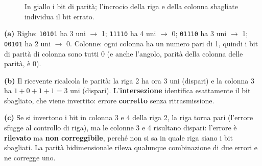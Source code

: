 \svolgimento
\begin{figure}[H]
\centering
\newcommand{\cella}[3]{\node[draw=black!40, minimum size=0.55cm, font=\small\ttfamily, fill=#3] at (#1) {#2};}
\caption{In giallo i bit di parità; l'incrocio della riga e della colonna sbagliate individua il bit errato.}
\end{figure}

\textbf{(a)} Righe: \texttt{10101} ha 3 uni $\rightarrow$ 1; \texttt{11110} ha 4 uni $\rightarrow$ 0; \texttt{01110} ha 3 uni
$\rightarrow$ 1; \texttt{00101} ha 2 uni $\rightarrow$ 0. Colonne: ogni colonna ha un numero pari di 1, quindi i bit di parità di
colonna sono tutti 0 (e anche l'angolo, parità della colonna delle parità, è 0).

\textbf{(b)} Il ricevente ricalcola le parità: la riga 2 ha ora 3 uni (dispari) e la colonna 3 ha $1+0+1+1 = 3$ uni (dispari).
L'\textbf{intersezione} identifica esattamente il bit sbagliato, che viene invertito: errore \textbf{corretto} senza ritrasmissione.

\textbf{(c)} Se si invertono i bit in colonna 3 e 4 della riga 2, la riga torna pari (l'errore sfugge al controllo di riga), ma le
colonne 3 e 4 risultano dispari: l'errore è \textbf{rilevato} ma \textbf{non correggibile}, perché non si sa in quale riga siano i bit
sbagliati. La parità bidimensionale rileva qualunque combinazione di due errori e ne corregge uno.

